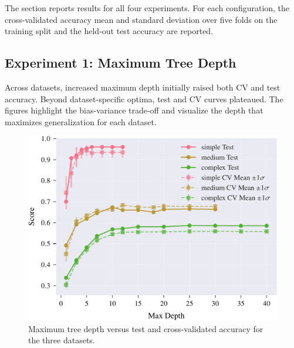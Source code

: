 \documentclass[conference]{IEEEtran}
\begin{document}
The section reports results for all four experiments. For each configuration, the cross-validated accuracy mean and standard deviation over five folds on the training split and the held-out test accuracy are reported. 

\subsection{Experiment 1: Maximum Tree Depth}

Across datasets, increased maximum depth initially raised both CV and test accuracy. Beyond dataset-specific optima, test and CV curves plateaued. The figures highlight the bias-variance trade-off and visualize the depth that maximizes generalization for each dataset.

\begin{figure}[H]
  \centering
  \includegraphics[width=\linewidth]{images/all_datasets_depth_accuracy.pdf}
  \caption{Maximum tree depth versus test and cross-validated accuracy for the three datasets.}
  \label{fig:exp1-depth-acc}
\end{figure}
\end{document}
